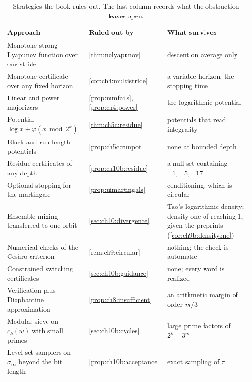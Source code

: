 \begin{table}[!htbp]
\centering\small
\setlength{\tabcolsep}{3pt}
\caption{Strategies the book rules out. The last column records what the
obstruction leaves open.}
\label{tab:ch10d:obstructions}
\begin{tabular}{@{}>{\raggedright\arraybackslash}p{}>{\raggedright\arraybackslash}p{}>{\raggedright\arraybackslash}p{}@{}}
\toprule
Approach & Ruled out by & What survives \\
\midrule
Monotone strong Lyapunov function over one stride & \cref{thm:nolyapunov} & descent on average only \\
Monotone certificate over any fixed horizon & \cref{cor:ch4:multistride} & a variable horizon, the stopping time \\
Linear and power majorizers & \cref{prop:mmfails}, \cref{prop:ch4:power} & the logarithmic potential \\
Potential $\log x+\varphi(x\bmod2^k)$ & \cref{thm:ch5c:residue} & potentials that read integrality \\
Block and run length potentials & \cref{prop:ch5c:runpot} & none at bounded depth \\
Residue certificates of any depth & \cref{prop:ch10b:residue} & a null set containing $-1,-5,-17$ \\
Optional stopping for the martingale & \cref{prop:uimartingale} & conditioning, which is circular \\
Ensemble mixing transferred to one orbit & \cref{sec:ch10:divergence} & Tao's logarithmic density; density one of reaching $1$, given the preprints (\cref{cor:ch9b:densityone}) \\
Numerical checks of the Ces\`aro criterion & \cref{rem:ch9:circular} & nothing; the check is automatic \\
Constrained switching certificates & \cref{sec:ch10b:guidance} & none; every word is realized \\
Verification plus Diophantine approximation & \cref{prop:ch8:insufficient} & an arithmetic margin of order $m/3$ \\
Modular sieve on $c_k(w)$ with small primes & \cref{sec:ch10b:cycles} & large prime factors of $2^k-3^m$ \\
Level set samplers on $\sigma_\infty$ beyond the bit length & \cref{prop:ch10b:acceptance} & exact sampling of $\tau$ \\
\bottomrule
\end{tabular}
\end{table}

